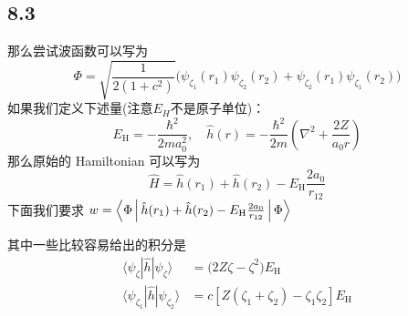 \subsection{8.3}

那么尝试波函数可以写为
\begin{equation}
    \Phi = \sqrt{\frac{1}{2 (1+c^2)}} \big( \psi_{\zeta_1} (r_1) \psi_{\zeta_2} (r_2) + \psi_{\zeta_2} (r_1) \psi_{\zeta_1} (r_2) \big)
\end{equation}
如果我们定义下述量(注意$ E_H $不是原子单位)：
\begin{equation*}
    E_\mathrm{H} = - \frac{\hbar^2}{2 m a_0^2}, \quad \hat h (r) = - \frac{\hbar^2}{2m} \left( \nabla^2 + \frac{2 Z}{a_0 r} \right)
\end{equation*}
那么原始的 Hamiltonian 可以写为%
\begin{equation}
    \hat H = \hat h (r_1) + \hat h (r_2) - E_\mathrm{H} \frac{2 a_0}{r_{12}}
\end{equation}
下面我们要求
$
w = \Braket{\Phi | \hat h (r_1) + \hat h (r_2) - E_\mathrm{H} \frac{2 a_0}{r_{12}} | \Phi }
$

其中一些比较容易给出的积分是
\begin{align}
\langle \psi_\zeta | \hat h | \psi_\zeta \rangle &= \big( 2 Z \zeta - \zeta^2 \big) E_\mathrm{H} \\
\langle \psi_{\zeta_1} | \hat h | \psi_{\zeta_2} \rangle &= c [ Z (\zeta_1 + \zeta_2) - \zeta_1 \zeta_2 ] E_\mathrm{H}
\end{align}




